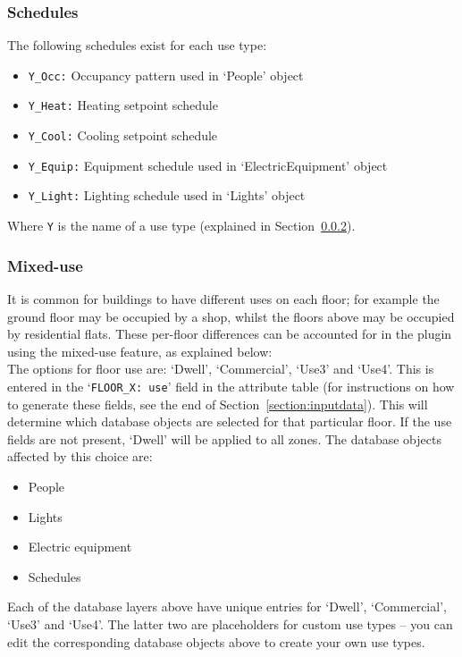 \documentclass{article}
\begin{document}
\subsubsection{Schedules}
The following schedules exist for each use type:
\begin{itemize}
    \item \texttt{Y\_Occ:} Occupancy pattern used in ‘People’ object
    \item \texttt{Y\_Heat:} Heating setpoint schedule
    \item \texttt{Y\_Cool:} Cooling setpoint schedule
    \item \texttt{Y\_Equip:} Equipment schedule used in ‘ElectricEquipment’ object
    \item \texttt{Y\_Light:} Lighting schedule used in ‘Lights’ object
\end{itemize}
Where \texttt{Y} is the name of a use type (explained in Section~\ref{section:mixeduse}).

\subsubsection{Mixed-use}
\label{section:mixeduse}
It is common for buildings to have different uses on each floor; for example the ground floor may be occupied by a shop, whilst the floors above may be occupied by residential flats. These per-floor differences can be accounted for in the plugin using the mixed-use feature, as explained below: \\

The options for floor use are: `Dwell', `Commercial', `Use3' and `Use4'. This is entered in the `\texttt{FLOOR\_X:~use}' field in the attribute table (for instructions on how to generate these fields, see the end of Section~\ref{section:inputdata}). This will determine which database objects are selected for that particular floor. If the use fields are not present, `Dwell' will be applied to all zones. The database objects affected by this choice are:
\begin{itemize}
    \item People
    \item Lights
    \item Electric equipment
    \item Schedules
\end{itemize}
Each of the database layers above have unique entries for `Dwell', `Commercial', `Use3' and `Use4'. The latter two are placeholders for custom use types -- you can edit the corresponding database objects above to create your own use types. \\
\end{document}
